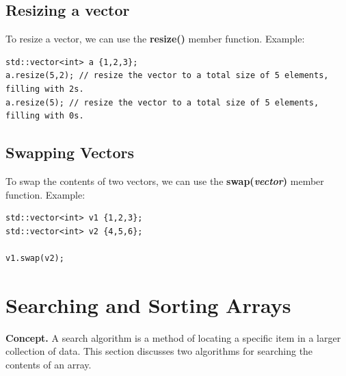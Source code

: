 \documentclass{report}
\begin{document}
    \bigbreak \noindent 
    \subsection{Resizing a vector}
    \bigbreak \noindent 
    To resize a vector, we can use the \textbf{resize()} member function.
    \bigbreak \noindent 
    Example:
    \bigbreak \noindent 
    \sepline
    \begin{verbatim}
std::vector<int> a {1,2,3};
a.resize(5,2); // resize the vector to a total size of 5 elements, filling with 2s.
a.resize(5); // resize the vector to a total size of 5 elements, filling with 0s.
    \end{verbatim}
    \sepline

    \bigbreak \noindent 
    \subsection{Swapping Vectors}
    \bigbreak \noindent 
    To swap the contents of two vectors, we can use the \textbf{swap(\textit{vector})} member function.
    \bigbreak \noindent 
    Example:
    \bigbreak \noindent 
    \sepline
    \begin{verbatim}
std::vector<int> v1 {1,2,3};
std::vector<int> v2 {4,5,6};

v1.swap(v2);
    \end{verbatim}
    \sepline

    \pagebreak \bigbreak \noindent 
    \section{\LARGE Searching and Sorting Arrays}
    \bigbreak \noindent 
    \textbf{Concept.} A search algorithm is a method of locating a specific item in a larger collection of data. This section discusses two algorithms for searching the contents of an array.
    \bigbreak \noindent 
\end{document}
